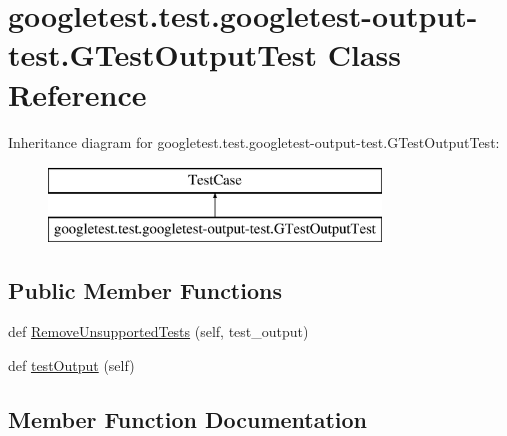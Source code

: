 \hypertarget{classgoogletest_1_1test_1_1googletest-output-test_1_1_g_test_output_test}{}\section{googletest.\+test.\+googletest-\/output-\/test.G\+Test\+Output\+Test Class Reference}
\label{classgoogletest_1_1test_1_1googletest-output-test_1_1_g_test_output_test}
Inheritance diagram for googletest.\+test.\+googletest-\/output-\/test.G\+Test\+Output\+Test\+:\begin{figure}[H]
\begin{center}
\leavevmode
\includegraphics[height=2.000000cm]{dd/d6e/classgoogletest_1_1test_1_1googletest-output-test_1_1_g_test_output_test}
\end{center}
\end{figure}
\subsection*{Public Member Functions}
\begin{DoxyCompactItemize}
\item 
def \mbox{\hyperlink{classgoogletest_1_1test_1_1googletest-output-test_1_1_g_test_output_test_a0cd3f0d5879622f0d9b88fe62e74de34}{Remove\+Unsupported\+Tests}} (self, test\+\_\+output)
\item 
def \mbox{\hyperlink{classgoogletest_1_1test_1_1googletest-output-test_1_1_g_test_output_test_a2809c6a299e88f9aa9b349a62a3591d7}{test\+Output}} (self)
\end{DoxyCompactItemize}


\subsection{Member Function Documentation}
\mbox{\label{classgoogletest_1_1test_1_1googletest-output-test_1_1_g_test_output_test_a0cd3f0d5879622f0d9b88fe62e74de34}} 
